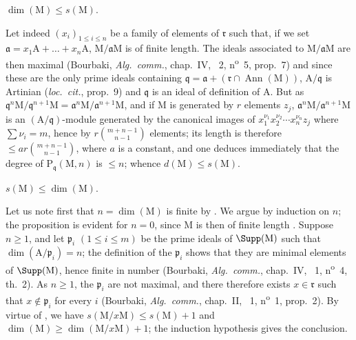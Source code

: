 
\begin{env}[16.2.3.3]
\label{0.16.2.3.3}
$\dim(\mathrm{M})\leq s(\mathrm{M})$.
\end{env}

Let indeed $(x_i)_{1\leq i\leq n}$ be a family of elements of $\mathfrak{r}$ such that, if we set $\mathfrak{a}=x_1\mathrm{A}+\ldots+x_n\mathrm{A}$, $\mathrm{M}/\mathfrak{a}\mathrm{M}$ is of finite length.
The ideals associated to $\mathrm{M}/\mathfrak{a}\mathrm{M}$ are then maximal (Bourbaki, \emph{Alg.~comm.}, chap.~IV, \textsection~2, n\textsuperscript{o}~5, prop.~7) and since these are the only prime ideals containing $\mathfrak{q}=\mathfrak{a}+(\mathfrak{r}\cap\operatorname{Ann}(\mathrm{M}))$, $\mathrm{A}/\mathfrak{q}$ is Artinian (\emph{loc.~cit.}, prop.~9) and $\mathfrak{q}$ is an ideal of definition of $\mathrm{A}$.
But as $\mathfrak{q}^n\mathrm{M}/\mathfrak{q}^{n+1}\mathrm{M}=\mathfrak{a}^n\mathrm{M}/\mathfrak{a}^{n+1}\mathrm{M}$, and if $\mathrm{M}$ is generated by $r$ elements $z_j$, $\mathfrak{a}^n\mathrm{M}/\mathfrak{a}^{n+1}\mathrm{M}$ is an $(\mathrm{A}/\mathfrak{q})$-module generated by the canonical images of $x_1^{\nu_1}x_2^{\nu_2}\cdots x_n^{\nu_n}z_j$ where $\sum\nu_i=m$, hence by $r\binom{m+n-1}{n-1}$ elements; its length is therefore $\leq ar\binom{m+n-1}{n-1}$, where $a$ is a constant, and one deduces immediately that the degree of $\mathrm{P}_\mathfrak{q}(\mathrm{M},n)$ is $\leq n$; whence $d(\mathrm{M})\leq s(\mathrm{M})$.

\begin{env}[16.2.3.4]
\label{0.16.2.3.4}
$s(\mathrm{M})\leq\dim(\mathrm{M})$.
\end{env}

Let us note first that $n=\dim(\mathrm{M})$ is finite by .
We argue by induction on $n$; the proposition is evident for $n=0$, since $\mathrm{M}$ is then of finite length .
Suppose $n\geq 1$, and let $\mathfrak{p}_i$ $(1\leq i\leq m)$ be the prime ideals of $\Supp(\mathrm{M})$ such that $\dim(\mathrm{A}/\mathfrak{p}_i)=n$; the definition of the $\mathfrak{p}_i$ shows that they are minimal elements of $\Supp(\mathrm{M})$, hence finite in number (Bourbaki, \emph{Alg.~comm.}, chap.~IV, \textsection~1, n\textsuperscript{o}~4, th.~2).
As $n\geq 1$, the $\mathfrak{p}_i$ are not maximal, and there therefore exists $x\in\mathfrak{r}$ such that $x\notin\mathfrak{p}_i$ for every $i$ (Bourbaki, \emph{Alg.~comm.}, chap.~II, \textsection~1, n\textsuperscript{o}~1, prop.~2).
By virtue of , we have $s(\mathrm{M}/x\mathrm{M})\leq s(\mathrm{M})+1$ and $\dim(\mathrm{M})\geq\dim(\mathrm{M}/x\mathrm{M})+1$; the induction hypothesis gives the conclusion.

